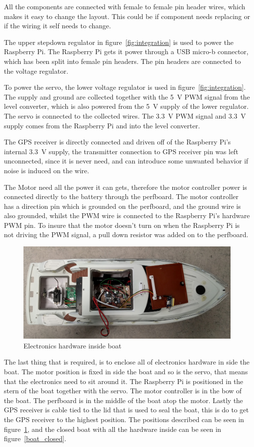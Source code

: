 All the components are connected with female to female pin header wires, which makes it easy to change the layout. This could be if component needs replacing or if the wiring it self needs to change.

The upper stepdown regulator in figure~\ref{fig:integration} is used to power the Raspberry Pi. The Raspberry Pi gets it power through a USB micro-b connector, which has been split into female pin headers. The pin headers are connected to the voltage regulator. 

To power the servo, the lower voltage regulator is used in figure~\ref{fig:integration}. The supply and ground are collected together with the 5~V PWM signal from the level converter, which is also powered from the 5~V supply of the lower regulator. The servo is connected to the collected wires. The 3.3~V PWM signal and 3.3~V supply comes from the Raspberry Pi and into the level converter.

The GPS receiver is directly connected and driven off of the Raspberry Pi's internal 3.3~V supply, the transmitter connection to GPS receiver pin was left unconnected, since it is never need, and can introduce some unwanted behavior if noise is induced on the wire.

The Motor need all the power it can gets, therefore the motor controller power is connected directly to the battery through the perfboard. The motor controller has a direction pin which is grounded on the perfboard, and the ground wire is also grounded, whilst the PWM wire is connected to the Raspberry Pi's hardware PWM pin. To insure that the motor doesn't turn on when the Raspberry Pi is not driving the PWM signal, a pull down resistor was added on to the perfboard. 

\begin{figure}[H]
\centering
\includegraphics[width=0.7\linewidth]{Images/Implementation/all_hardware_in_boat}
\caption{Electronics hardware inside boat}
\label{fig:electronics_boat}
\end{figure}

The last thing that is required, is to enclose all of electronics hardware in side the boat. The motor position is fixed in side the boat and so is the servo, that means that the electronics need to sit around it. The Raspberry Pi is positioned in the stern of the boat together with the servo. The motor controller is in the bow of the boat. The perfboard is in the middle of the boat atop the motor. Lastly the GPS receiver is cable tied to the lid that is used to seal the boat, this is do to get the GPS receiver to the highest position. The positions described can be seen in figure~\ref{fig:electronics_boat}, and the closed boat with all the hardware inside can be seen in figure~\ref{boat_closed}.

